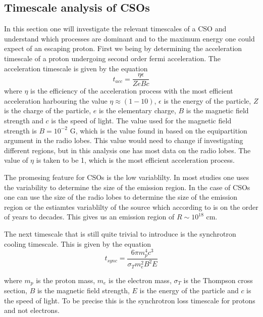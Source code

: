 \subsection{Timescale analysis of CSOs}
In this section one will investigate the relevant timescales of a CSO and understand which processes are dominant and to the maximum energy one could expect of an escaping proton. 
First we being by determining the acceleration timescale of a proton undergoing second order fermi acceleration. The acceleration timescale is given by the equation
\begin{equation}
    t_{acc} =  \frac{\eta \epsilon}{Z e B c}
\end{equation}
where $\eta$ is the efficiency of the acceleration process with the most efficient acceleration harbouring the value $\eta \approx (1-10)$, $\epsilon$ is the energy of the particle, $Z$ is the charge of the particle, $e$ is the elementary charge, $B$ is the magnetic field strength and $c$ is the speed of light.
The value used for the magnetic field strength is $B = 10^{-2}$ G, which is the value found in \cite{bronzini2024investigating} based on the equipartition argument in the radio lobes. This value would need to change 
if investigating different regions, but in this analysis one has most data on the radio lobes. 
The value of $\eta$ is taken to be 1, which is the most efficient acceleration process.

The promesing feature for CSOs is the low variablilty. In most studies one uses the variability to determine the size of the emission region. In the case of CSOs one can use the size of the radio lobes to determine the size of the emission region or the 
estiamtes variablilty of the source which according to \cite{kiehlmann2023compact} is on the order of years to decades. This gives us an emission region of $R \sim 10^{18}$ cm.

The next timescale that is still quite trivial to introduce is the synchrotron cooling timescale. This is given by the equation
\begin{equation}
    t_{sync} = \frac{6\pi m_p^4 c^3}{\sigma_T m_e^2 B^2 E}
\end{equation}

where $m_p$ is the proton mass, $m_e$ is the electron mass, $\sigma_T$ is the Thompson cross section, $B$ is the magnetic field strength, $E$ is the energy of the particle and $c$ is the speed of light. To be precise 
this is the synchrotron loss timescale for protons and not electrons. 

